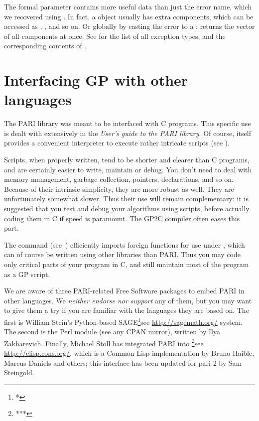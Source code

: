The  formal parameter contains more useful data than just the error
name, which we recovered using . In fact, a 
object usually has extra components, which can be accessed as
, , and so on. Or globally by
casting the error to a :  returns the vector
of all components at once. See  for the list of all
exception types, and the corresponding contents of .

\section{Interfacing GP with other languages}
\noindent
The PARI library was meant to be interfaced with C programs. This specific
use is dealt with extensively in the \emph{User's guide to the PARI library}.
Of course,  itself provides a convenient  interpreter to execute
rather intricate scripts (see ).

Scripts, when properly written, tend to be shorter and clearer than C
programs, and are certainly easier to write, maintain or debug. You don't
need to deal with memory management, garbage collection, pointers,
declarations, and so on. Because of their intrinsic simplicity, they are more
robust as well. They are unfortunately somewhat slower. Thus their use will
remain complementary: it is suggested that you test and debug your algorithms
using scripts, before actually coding them in C if speed is paramount.
The GP2C compiler often eases this part.

The  command (see~) efficiently imports
foreign functions for use under , which can of course be written
using other libraries than PARI. Thus you may code only critical parts
of your program in C, and still maintain most of the program as a GP script.

We are aware of three PARI-related Free Software packages to embed PARI in
other languages. We \emph{neither endorse nor support} any of them, but you
may want to give them a try if you are familiar with the languages they are
based on. The first is William Stein's Python-based SAGE\footnote{*}{see
\url{http://sagemath.org/}} system. The second is the  Perl
module (see any CPAN mirror), written by Ilya Zakharevich.
Finally, Michael Stoll has integrated PARI into \footnote{***}{see
\url{http://clisp.cons.org/}}, which is a Common Lisp implementation by Bruno
Haible, Marcus Daniels and others; this interface has been updated for pari-2
by Sam Steingold.

